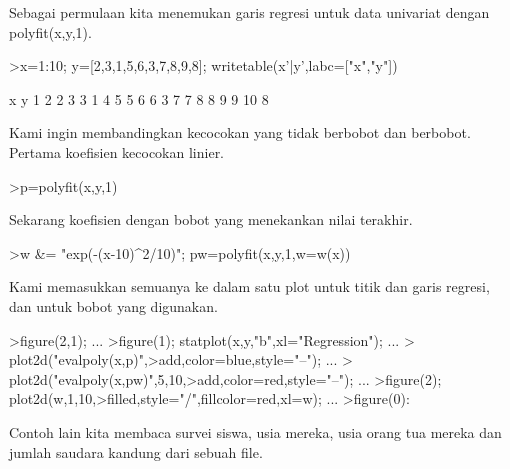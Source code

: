 \documentclass[a4paper,10pt]{article}
\begin{document}
\begin{eulernotebook}
\begin{eulercomment}
\begin{eulercomment}
\begin{eulercomment}
Sebagai permulaan kita menemukan garis regresi untuk data univariat
dengan polyfit(x,y,1).
\end{eulercomment}
\begin{eulerprompt}
>x=1:10; y=[2,3,1,5,6,3,7,8,9,8]; writetable(x'|y',labc=["x","y"])
\end{eulerprompt}
\begin{euleroutput}
           x         y
           1         2
           2         3
           3         1
           4         5
           5         6
           6         3
           7         7
           8         8
           9         9
          10         8
\end{euleroutput}
\begin{eulercomment}
Kami ingin membandingkan kecocokan yang tidak berbobot dan berbobot.
Pertama koefisien kecocokan linier.
\end{eulercomment}
\begin{eulerprompt}
>p=polyfit(x,y,1)
\end{eulerprompt}
\begin{euleroutput}
  [0.733333,  0.812121]
\end{euleroutput}
\begin{eulercomment}
Sekarang koefisien dengan bobot yang menekankan nilai terakhir.
\end{eulercomment}
\begin{eulerprompt}
>w &= "exp(-(x-10)^2/10)"; pw=polyfit(x,y,1,w=w(x))
\end{eulerprompt}
\begin{euleroutput}
  [4.71566,  0.38319]
\end{euleroutput}
\begin{eulercomment}
Kami memasukkan semuanya ke dalam satu plot untuk titik dan garis
regresi, dan untuk bobot yang digunakan.
\end{eulercomment}
\begin{eulerprompt}
>figure(2,1);  ...
>figure(1); statplot(x,y,"b",xl="Regression"); ...
>  plot2d("evalpoly(x,p)",>add,color=blue,style="--"); ...
>  plot2d("evalpoly(x,pw)",5,10,>add,color=red,style="--"); ...
>figure(2); plot2d(w,1,10,>filled,style="/",fillcolor=red,xl=w); ...
>figure(0):
\end{eulerprompt}
\begin{eulercomment}
Contoh lain kita membaca survei siswa, usia mereka, usia orang tua
mereka dan jumlah saudara kandung dari sebuah file.


\end{eulercomment}
\end{eulercomment}
\end{eulercomment}
\end{eulernotebook}
\end{document}
